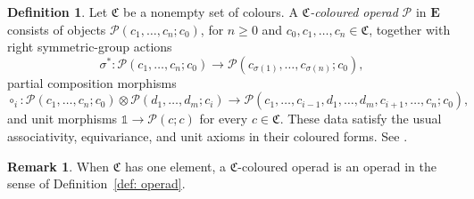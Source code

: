 \documentclass{amsart}
\newcommand{\bE}{\mathbf{E}}
\theoremstyle{definition}
\newtheorem{definition}[theorem]{Definition}%
\newtheorem{remark}[theorem]{Remark}%
\numberwithin{equation}{section}
\begin{document}
\begin{definition}
\label{def: coloured operad}
Let $\mathfrak C$ be a nonempty set of colours. A
\emph{$\mathfrak C$-coloured operad} $\mathcal P$ in $\bE$ consists
of objects
$\mathcal P(c_1,\ldots,c_n;c_0)$, for $n\geq0$ and
$c_0,c_1,\ldots,c_n\in\mathfrak C$, together with right
symmetric-group actions
\[
\sigma^*\colon
\mathcal P(c_1,\ldots,c_n;c_0)
\longrightarrow
\mathcal P(c_{\sigma(1)},\ldots,c_{\sigma(n)};c_0),
\]
partial composition morphisms
\[
\circ_i\colon
\mathcal P(c_1,\ldots,c_n;c_0)\otimes
\mathcal P(d_1,\ldots,d_m;c_i)
\longrightarrow
\mathcal P(c_1,\ldots,c_{i-1},
d_1,\ldots,d_m,c_{i+1},\ldots,c_n;c_0),
\]
and unit morphisms
$\mathbb 1\to\mathcal P(c;c)$ for every $c\in\mathfrak C$.
These data satisfy the usual associativity, equivariance, and unit
axioms in their coloured forms. See
\cite[Definition~1.1]{bm_resolutions}.
\end{definition}

\begin{remark}
When $\mathfrak C$ has one element, a $\mathfrak C$-coloured operad
is an operad in the sense of Definition~\ref{def: operad}.
\end{remark}
\end{document}
